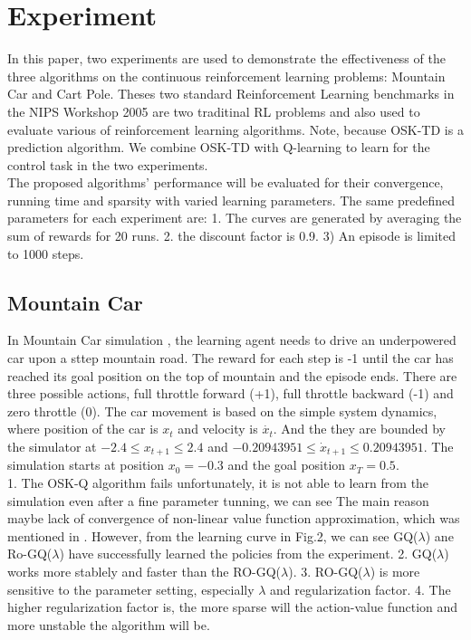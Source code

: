 \documentclass[conference]{IEEEtran}
\begin{document}


\section{Experiment}
In this paper, two experiments are used to demonstrate the effectiveness of the three algorithms on the continuous reinforcement learning problems: Mountain Car and Cart Pole. Theses two standard Reinforcement Learning benchmarks in the NIPS Workshop 2005 are two traditinal RL problems and also used to evaluate various of reinforcement learning algorithms. Note, because OSK-TD is a prediction algorithm. We combine OSK-TD with Q-learning to learn for the control task in the two experiments.\\

The proposed algorithms' performance will be evaluated for their convergence, running time and sparsity with varied learning parameters. The same predefined parameters for each experiment are: 1. The curves are generated  by averaging the sum of rewards for 20 runs. 2. the discount factor is 0.9. 3) An episode is limited to 1000 steps.
\subsection{Mountain Car}
In Mountain Car simulation \cite{sutton1998reinforcement}, the learning agent needs to drive an underpowered car upon a sttep mountain road. The reward for each step is -1 until the car has reached its goal position on the top of mountain and the episode ends. There are three possible actions, full throttle forward (+1), full throttle backward (-1) and zero throttle (0). The car movement is based on the simple system dynamics, where position of the car is $x_t$ and velocity is $\dot{x_t}$. And the they are bounded by the simulator at $-2.4 \leq x_{t+1} \leq 2.4$ and $-0.20943951 \leq \dot{x}_{t+1} \leq 0.20943951$. The simulation starts at position $x_0=-0.3$ and the goal position $x_T=0.5$.\\

1. The OSK-Q algorithm fails unfortunately, it is not able to learn from the simulation even after a fine parameter tunning, we can see The main reason maybe lack of convergence of non-linear value function approximation, which was mentioned in \cite{tsitsiklis1997analysis}. However, from the learning curve in Fig.2, we can see GQ($\lambda$) ane Ro-GQ($\lambda$) have successfully learned the policies from the experiment. 2. GQ($\lambda$) works more stablely and faster than the RO-GQ($\lambda$). 3. RO-GQ($\lambda$) is more sensitive to the parameter setting, especially $\lambda$ and regularization factor. 4. The higher regularization factor is, the more sparse will the action-value function and more unstable the algorithm will be.
\end{document}
